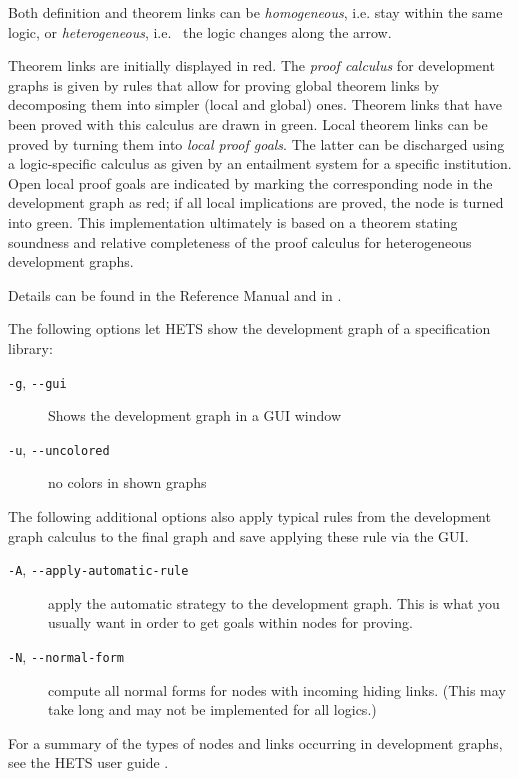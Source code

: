 \documentclass{article}
\newcommand{\normalTEXTSC}[2]{{#1\scriptsize#2}}
\newcommand     {\Hets}{\normalTEXTSC{H}{ETS}\xspace}
\begin{document}
Both definition and theorem links can be \emph{homogeneous},
i.e. stay within the same logic, or \emph{heterogeneous}, i.e.\ %
the logic changes along the arrow. 

Theorem links are initially displayed in red.
The \emph{proof calculus} for development graphs
\cite{MossakowskiEtAl05,Habil} is given by rules
that allow for proving global theorem links by decomposing them
into simpler (local and global) ones. Theorem links that have been
proved with this calculus are drawn in green. Local theorem links can
be proved by turning them into \emph{local proof goals}.  The latter
can be discharged using a logic-specific calculus as given by an
entailment system for a specific institution. Open local
proof goals are indicated by marking the corresponding node in the
development graph as red; if all local implications are proved, the
node is turned into green. This implementation ultimately is based
on a theorem \cite{Habil} stating soundness and relative completeness
of the proof calculus for heterogeneous development graphs.

Details can be found in the \CASL Reference Manual \cite[IV:4]{CASL/RefManual}
and in \cite{Habil,MossakowskiEtAl05,MossakowskiEtAl07b}.

The following options let \Hets show the development graph of
a specification library:
\begin{description}
\item[\texttt{-g}, \texttt{-{}-gui}] Shows the development graph in a GUI window
\item[\texttt{-u}, \texttt{-{}-uncolored}] no colors in shown graphs
\end{description}

The following additional options also apply typical rules from the development
graph calculus to the final graph and save applying these rule via the GUI.
\begin{description}
\item[\texttt{-A}, \texttt{-{}-apply-automatic-rule}] apply the automatic
  strategy to the development graph. This is what you usually want in order to
  get goals within nodes for proving.
\item[\texttt{-N}, \texttt{-{}-normal-form}] compute all normal forms for nodes
  with incoming hiding links. (This may take long and may not be implemented
  for all logics.)
\end{description}

For a summary of the types of nodes and links occurring in
development graphs, see the \Hets user guide \cite{HetsUserGuide}.\\
\end{document}
